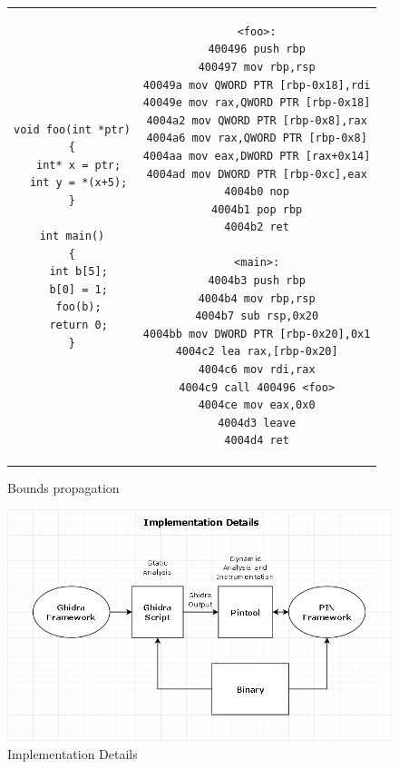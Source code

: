 \begin{figure}
\begin{centering}
\begin{tabular}{ c | c }
\begin{lstlisting}
void foo(int *ptr)
{
  int* x = ptr;
  int y = *(x+5);
}

int main()
{
  int b[5];
  b[0] = 1;
  foo(b);
  return 0;
}
\end{lstlisting}
&
\begin{lstlisting}
<foo>:
400496 push rbp
400497 mov rbp,rsp
40049a mov QWORD PTR [rbp-0x18],rdi
40049e mov rax,QWORD PTR [rbp-0x18]
4004a2 mov QWORD PTR [rbp-0x8],rax
4004a6 mov rax,QWORD PTR [rbp-0x8]
4004aa mov eax,DWORD PTR [rax+0x14]
4004ad mov DWORD PTR [rbp-0xc],eax
4004b0 nop
4004b1 pop rbp
4004b2 ret

<main>:
4004b3 push rbp
4004b4 mov rbp,rsp
4004b7 sub rsp,0x20
4004bb mov DWORD PTR [rbp-0x20],0x1
4004c2 lea rax,[rbp-0x20]
4004c6 mov rdi,rax
4004c9 call 400496 <foo>
4004ce mov eax,0x0
4004d3 leave
4004d4 ret
\end{lstlisting}
\end{tabular}
\caption{Bounds propagation\label{fig:fig35}}
\par\end{centering}
\end{figure}

\begin{figure}
\begin{centering}
\includegraphics[width=138mm]{images/implementation_details.png}
\caption{Implementation Details\label{fig:fig36}}
\par\end{centering}
\end{figure}